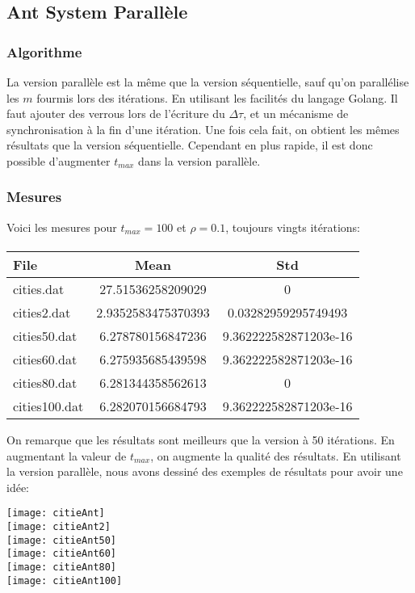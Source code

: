 \documentclass[a4paper, 11pt]{article}
\begin{document}
\subsection{Ant System Parallèle}
\subsubsection{Algorithme}
La version parallèle est la même que la version séquentielle, sauf qu'on parallélise les $m$ fourmis lors des itérations. En utilisant
les facilités du langage Golang. Il faut ajouter des verrous lors de l'écriture du $\Delta\tau$, et un mécanisme de synchronisation
à la fin d'une itération.
Une fois cela fait, on obtient les mêmes résultats que la version séquentielle. Cependant en plus rapide, il est donc possible d'augmenter
$t_{max}$ dans la version parallèle.

\subsubsection{Mesures}
Voici les mesures pour $t_{max} = 100$ et $\rho = 0.1$, toujours vingts itérations:
\paragraph{}
\begin{tabular}{|l|c|c|}
 \hline
 File & Mean & Std\\
 \hline
 cities.dat& 27.51536258209029 & 0\\
 \hline
cities2.dat& 2.9352583475370393  & 0.03282959295749493\\
 \hline
cities50.dat& 6.278780156847236  & 9.362222582871203e-16\\
 \hline
cities60.dat& 6.275935685439598  & 9.362222582871203e-16\\
 \hline
cities80.dat& 6.281344358562613  & 0\\
 \hline
cities100.dat& 6.282070156684793  & 9.362222582871203e-16\\
 \hline
\end{tabular}

On remarque que les résultats sont meilleurs que la version à 50 itérations. En augmentant la valeur de $t_{max}$, on augmente la qualité
des résultats. En utilisant la version parallèle, nous avons dessiné des exemples de résultats pour avoir une idée:

\texttt{[image: citieAnt]}\\
\texttt{[image: citieAnt2]}\\
\texttt{[image: citieAnt50]}\\
\texttt{[image: citieAnt60]}\\
\texttt{[image: citieAnt80]}\\
\texttt{[image: citieAnt100]}\\
\end{document}
